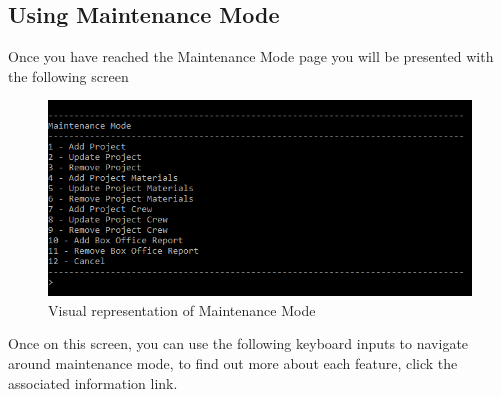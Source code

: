 \documentclass[
  english,
  a4paper,
,tablecaptionabove
]{scrartcl}
\begin{document}
\newpage

\hypertarget{using-maintenance-mode}{%
\subsection{Using Maintenance Mode}\label{using-maintenance-mode}}

Once you have reached the Maintenance Mode page you will be presented
with the following screen

\begin{figure}
\centering
\includegraphics{images/user-guide/main-menu/using-maintenance-mode.png}
\caption{Visual representation of Maintenance Mode}
\end{figure}

Once on this screen, you can use the following keyboard inputs to
navigate around maintenance mode, to find out more about each feature,
click the associated information link.
\end{document}
